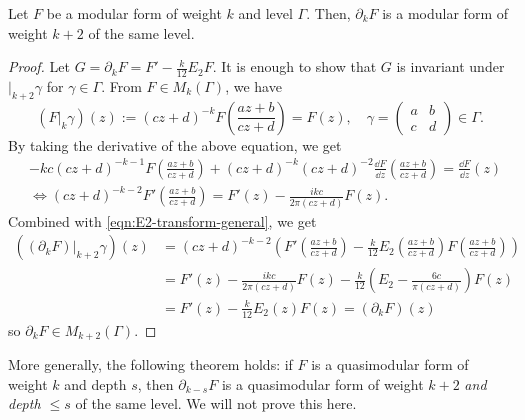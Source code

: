 \begin{theorem}\label{thm:serre-der-modularity}
Let $F$ be a modular form of weight $k$ and level $\Gamma$.
Then, $\partial_{k}F$ is a modular form of weight $k + 2$ of the same level.
\end{theorem}
\begin{proof}
Let $G = \partial_{k}F = F' - \frac{k}{12}E_2 F$.
It is enough to show that $G$ is invariant under $|_{k+2}\gamma$ for $\gamma \in \Gamma$.
From $F \in M_k(\Gamma)$, we have
\begin{equation}
    (F|_{k}\gamma)(z) := (cz + d)^{-k} F\left(\frac{az + b}{cz + d}\right) = F(z), \quad \gamma = \begin{pmatrix}a & b \\ c & d\end{pmatrix} \in \Gamma.
\end{equation}
By taking the derivative of the above equation, we get
\begin{align}
    &-kc (cz + d)^{-k - 1} F\left(\frac{az + b}{cz + d}\right) + (cz + d)^{-k} (cz + d)^{-2} \frac{\dd F}{\dd z}\left(\frac{az + b}{cz + d}\right) = \frac{\dd F}{\dd z}(z) \\
    &\Leftrightarrow (cz + d)^{-k - 2} F'\left(\frac{az + b}{cz + d}\right) = F'(z) - \frac{ikc}{2\pi(cz + d)}F(z).
\end{align}
Combined with \eqref{eqn:E2-transform-general}, we get
\begin{align}
    ((\partial_k F)|_{k+2}\gamma)(z) &= (cz + d)^{-k-2} \left(F'\left(\frac{az + b}{cz + d}\right) - \frac{k}{12}E_2\left(\frac{az + b}{cz + d}\right)F\left(\frac{az + b}{cz + d}\right)\right) \\
    &= F'(z) - \frac{ikc}{2 \pi(cz + d)} F(z) - \frac{k}{12} \left(E_2 - \frac{6c}{\pi(cz + d)}\right) F(z) \\
    &= F'(z) - \frac{k}{12} E_2(z) F(z) = (\partial_{k} F)(z)
\end{align}
so $\partial_{k}F \in M_{k+2}(\Gamma)$.
\end{proof}
\begin{remark}
More generally, the following theorem holds: if $F$ is a quasimodular form of weight $k$ and depth $s$, then $\partial_{k-s}F$ is a quasimodular form of weight $k + 2$ \emph{and depth $\le s$} of the same level. We will not prove this here.
\end{remark}

